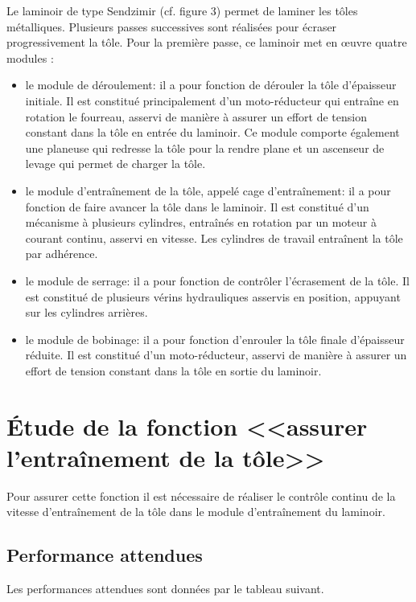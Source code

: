 \documentclass[10pt,fleqn]{article} %
\begin{document}
\begin{multicols}{2}
Le laminoir de type Sendzimir (cf. figure 3) permet de laminer les tôles métalliques. Plusieurs passes successives sont réalisées pour écraser progressivement la tôle. Pour la première passe, ce laminoir met en œuvre quatre modules :
\begin{itemize}
\item le module de déroulement: il a pour fonction de dérouler la tôle d'épaisseur initiale. Il est constitué principalement d'un moto-réducteur qui entraîne en rotation le fourreau, asservi de manière à assurer un effort de tension constant dans la tôle en entrée du laminoir. Ce module comporte également une planeuse qui redresse la tôle pour la rendre plane et un ascenseur de levage qui permet de charger la tôle.
\item le module d'entraînement de la tôle, appelé cage d'entraînement: il a pour fonction de faire avancer la tôle dans le laminoir. Il est constitué d'un mécanisme à plusieurs cylindres, entraînés en rotation par un moteur à courant continu, asservi en vitesse. Les cylindres de travail entraînent la tôle par adhérence.
\item le module de serrage: il a pour fonction de contrôler l'écrasement de la tôle. Il est constitué de plusieurs vérins hydrauliques asservis en position, appuyant sur les cylindres arrières.
\item le module de bobinage: il a pour fonction d'enrouler la tôle finale d'épaisseur réduite. Il est constitué d'un moto-réducteur, asservi de manière à assurer un effort de tension constant dans la tôle en sortie du laminoir.
\end{itemize}

\section*{Étude de la fonction <<assurer l'entraînement de la tôle>>}

Pour assurer cette fonction il est nécessaire de réaliser le contrôle continu de la vitesse d'entraînement de la tôle dans le module d'entraînement du laminoir.

\subsection*{Performance attendues}

Les performances attendues sont données par le tableau suivant.


\end{multicols}
\end{document}
